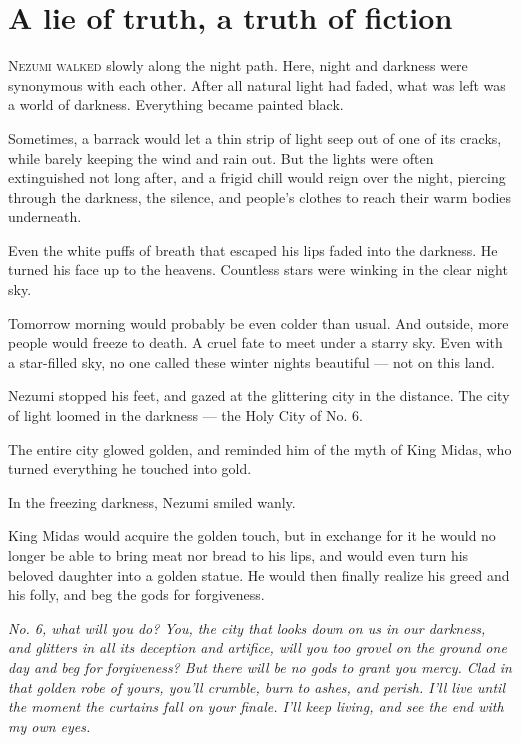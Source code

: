 
\chapter{A lie of truth, a truth of fiction}


\lettrine{N}{ezumi walked} slowly along the night path. Here, night and darkness were
synonymous with each other. After all natural light had faded, what was
left was a world of darkness. Everything became painted black.

Sometimes, a barrack would let a thin strip of light seep out of one of
its cracks, while barely keeping the wind and rain out. But the lights
were often extinguished not long after, and a frigid chill would reign
over the night, piercing through the darkness, the silence, and people's
clothes to reach their warm bodies underneath.

Even the white puffs of breath that escaped his lips faded into the
darkness. He turned his face up to the heavens. Countless stars were
winking in the clear night sky.

Tomorrow morning would probably be even colder than usual. And outside,
more people would freeze to death. A cruel fate to meet under a starry
sky. Even with a star-filled sky, no one called these winter nights
beautiful --- not on this land.

Nezumi stopped his feet, and gazed at the glittering city in the
distance. The city of light loomed in the darkness --- the Holy City of
No. 6.

The entire city glowed golden, and reminded him of the myth of King
Midas, who turned everything he touched into gold.

In the freezing darkness, Nezumi smiled wanly.

King Midas would acquire the golden touch, but in exchange for it he
would no longer be able to bring meat nor bread to his lips, and would
even turn his beloved daughter into a golden statue. He would then
finally realize his greed and his folly, and beg the gods for
forgiveness.

\emph{No. 6, what will you do? You, the city that looks down on us in our
darkness, and glitters in all its deception and artifice, will you too
grovel on the ground one day and beg for forgiveness? But there will be
no gods to grant you mercy. Clad in that golden robe of yours, you'll
crumble, burn to ashes, and perish. I'll live until the moment the
curtains fall on your finale. I'll keep living, and see the end with my
own eyes.}

